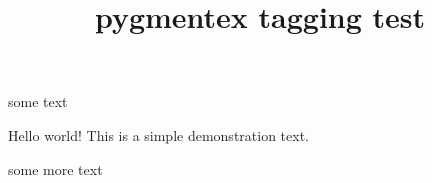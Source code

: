 \documentclass{article}
\title{pygmentex tagging test}
\begin{document}
some text
\begin{pygmented}
Hello world!
This is a simple demonstration text.
\end{pygmented}
some more text
\end{document}
